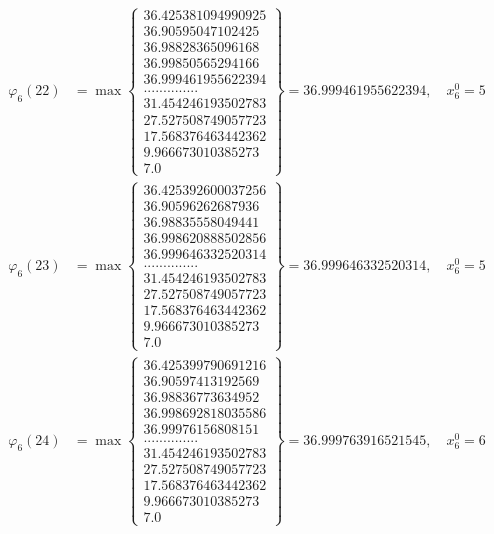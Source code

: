 \documentclass{article}
\begin{document}
\begin{align*}
  
  
  
\varphi_{6}(22) &= \max \left\{ \begin{array}{c}
36.425381094990925 \\
 36.90595047102425 \\
 36.98828365096168 \\
 36.99850565294166 \\
 36.999461955622394 \\
 .............. \\
 31.454246193502783 \\
 27.527508749057723 \\
 17.568376463442362 \\
 9.966673010385273 \\
 7.0
\end{array} \right\} = 36.999461955622394, \quad x_{6}^0 = 5\\
  
  
  
  
\varphi_{6}(23) &= \max \left\{ \begin{array}{c}
36.425392600037256 \\
 36.90596262687936 \\
 36.98835558049441 \\
 36.998620888502856 \\
 36.999646332520314 \\
 .............. \\
 31.454246193502783 \\
 27.527508749057723 \\
 17.568376463442362 \\
 9.966673010385273 \\
 7.0
\end{array} \right\} = 36.999646332520314, \quad x_{6}^0 = 5\\
  
  
  
  
\varphi_{6}(24) &= \max \left\{ \begin{array}{c}
36.425399790691216 \\
 36.90597413192569 \\
 36.98836773634952 \\
 36.998692818035586 \\
 36.99976156808151 \\
 .............. \\
 31.454246193502783 \\
 27.527508749057723 \\
 17.568376463442362 \\
 9.966673010385273 \\
 7.0
\end{array} \right\} = 36.999763916521545, \quad x_{6}^0 = 6\\
  

\end{align*}
\end{document}
